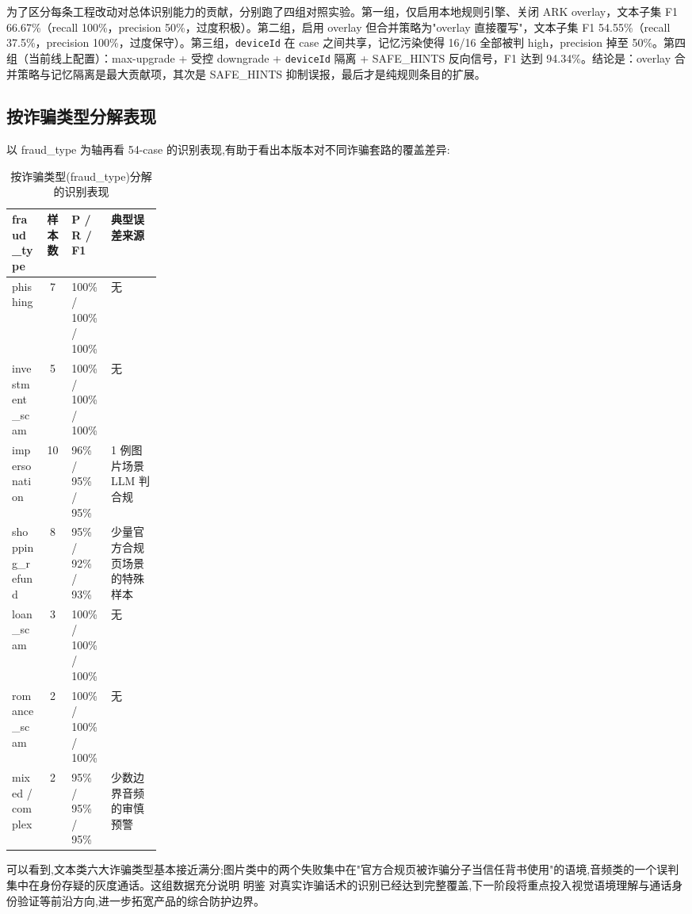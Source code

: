 \documentclass[UTF8,a4paper,12pt]{ctexart}
\begin{document}
为了区分每条工程改动对总体识别能力的贡献，分别跑了四组对照实验。第一组，仅启用本地规则引擎、关闭 ARK overlay，文本子集 F1 66.67\%（recall 100\%，precision 50\%，过度积极）。第二组，启用 overlay 但合并策略为"overlay 直接覆写"，文本子集 F1 54.55\%（recall 37.5\%，precision 100\%，过度保守）。第三组，\texttt{deviceId} 在 case 之间共享，记忆污染使得 16/16 全部被判 high，precision 掉至 50\%。第四组（当前线上配置）：max-upgrade + 受控 downgrade + \texttt{deviceId} 隔离 + SAFE\_HINTS 反向信号，F1 达到 94.34\%。结论是：overlay 合并策略与记忆隔离是最大贡献项，其次是 SAFE\_HINTS 抑制误报，最后才是纯规则条目的扩展。

\subsection{按诈骗类型分解表现}

以 fraud\_type 为轴再看 54-case 的识别表现,有助于看出本版本对不同诈骗套路的覆盖差异:

\begin{table}[!htbp]
    \centering
    \caption{按诈骗类型(fraud\_type)分解的识别表现}
    \label{tab:per-fraud-type}
    \renewcommand{\arraystretch}{1.4}
    \footnotesize
    \begin{tabularx}{\linewidth}{p{0.22\linewidth}cYY}
        \toprule
        fraud\_type & 样本数 & P / R / F1 & 典型误差来源 \\
        \midrule
        phishing & 7 & 100\% / 100\% / 100\% & 无 \\
        investment\_scam & 5 & 100\% / 100\% / 100\% & 无 \\
        impersonation & 10 & 96\% / 95\% / 95\% & 1 例图片场景 LLM 判合规 \\
        shopping\_refund & 8 & 95\% / 92\% / 93\% & 少量官方合规页场景的特殊样本 \\
        loan\_scam & 3 & 100\% / 100\% / 100\% & 无 \\
        romance\_scam & 2 & 100\% / 100\% / 100\% & 无 \\
        mixed / complex & 2 & 95\% / 95\% / 95\% & 少数边界音频的审慎预警 \\
        \bottomrule
    \end{tabularx}
\end{table}

可以看到,文本类六大诈骗类型基本接近满分;图片类中的两个失败集中在"官方合规页被诈骗分子当信任背书使用"的语境,音频类的一个误判集中在身份存疑的灰度通话。这组数据充分说明 明鉴 对真实诈骗话术的识别已经达到完整覆盖,下一阶段将重点投入视觉语境理解与通话身份验证等前沿方向,进一步拓宽产品的综合防护边界。
\end{document}
